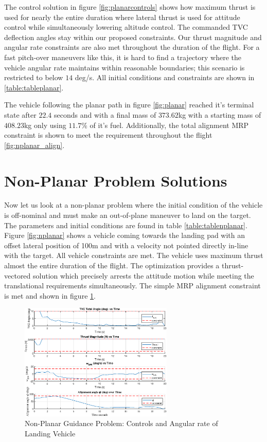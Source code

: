 The control solution in figure \ref{fig:planarcontrols} shows how maximum thrust is used for nearly the entire duration where lateral thrust is used for attitude control while simultaneously lowering altitude control. The commanded TVC deflection angles stay within our proposed constraints. Our thrust magnitude and angular rate constraints are also met throughout the duration of the flight. For a fast pitch-over maneuvers like this, it is hard to find a trajectory where the vehicle angular rate maintains within reasonable boundaries; this scenario is restricted to below $14$ deg/s. All initial conditions and constraints are shown in \ref{table:tableplanar}.


The vehicle following the planar path in figure \ref{fig:planar} reached it's terminal state after $22.4$ seconds and with a final mass of $373.62$kg with a starting mass of $408.23$kg only using $11.7$\% of it's fuel. Additionally, the total alignment MRP constraint is shown to meet the requirement throughout the flight \ref{fig:nplanar_align}.


\section{Non-Planar Problem Solutions}
Now let us look at a non-planar problem where the initial condition of the vehicle is off-nominal and must make an out-of-plane maneuver to land on the target. The parameters and initial conditions are found in table \ref{table:tablenplanar}. Figure \ref{fig:nplanar} shows a vehicle coming towards the landing pad with an offset lateral position of 100m and with a velocity not pointed directly in-line with the target. All vehicle constraints are met. The vehicle uses maximum thrust almost the entire duration of the flight. The optimization provides a thrust-vectored solution which precisely arrests the attitude motion while meeting the translational requirements simultaneously. The simple MRP alignment constraint is met and shown in figure \ref{fig:nplanarcontrols}.

\begin{figure}[!htbp] 
  \centering
  \includegraphics[width=0.65\textwidth]{figs/nonplanar_controls.eps}
  \caption{Non-Planar Guidance Problem: Controls and Angular rate of Landing Vehicle}
  \label{fig:nplanarcontrols}
 \end{figure}

